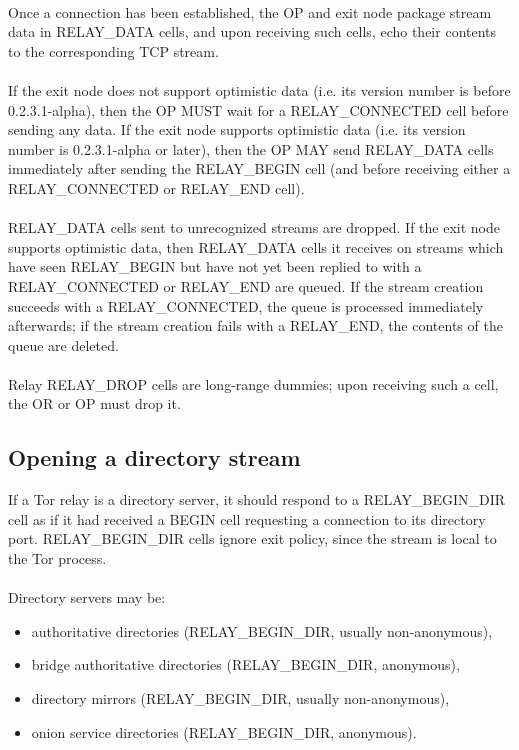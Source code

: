 \paragraph{}
Once a connection has been established, the OP and exit node
package stream data in RELAY\_DATA cells, and upon receiving such
cells, echo their contents to the corresponding TCP stream.

\paragraph{}
If the exit node does not support optimistic data (i.e. its
version number is before 0.2.3.1-alpha), then the OP MUST wait
for a RELAY\_CONNECTED cell before sending any data. If the exit
node supports optimistic data (i.e. its version number is
0.2.3.1-alpha or later), then the OP MAY send RELAY\_DATA cells
immediately after sending the RELAY\_BEGIN cell (and before
receiving either a RELAY\_CONNECTED or RELAY\_END cell).

\paragraph{}
RELAY\_DATA cells sent to unrecognized streams are dropped. If
the exit node supports optimistic data, then RELAY\_DATA cells it
receives on streams which have seen RELAY\_BEGIN but have not yet
been replied to with a RELAY\_CONNECTED or RELAY\_END are queued.
If the stream creation succeeds with a RELAY\_CONNECTED, the queue
is processed immediately afterwards; if the stream creation fails
with a RELAY\_END, the contents of the queue are deleted.

\paragraph{}
Relay RELAY\_DROP cells are long-range dummies; upon receiving such
a cell, the OR or OP must drop it.


\subsection{Opening a directory stream}
If a Tor relay is a directory server, it should respond to a
RELAY\_BEGIN\_DIR cell as if it had received a BEGIN cell requesting a
connection to its directory port. RELAY\_BEGIN\_DIR cells ignore exit
policy, since the stream is local to the Tor process.

\paragraph{}
Directory servers may be:
\begin{itemize}
    \item authoritative directories (RELAY\_BEGIN\_DIR, usually non-anonymous),
    \item bridge authoritative directories (RELAY\_BEGIN\_DIR, anonymous),
    \item directory mirrors (RELAY\_BEGIN\_DIR, usually non-anonymous),
    \item onion service directories (RELAY\_BEGIN\_DIR, anonymous).
\end{itemize}


